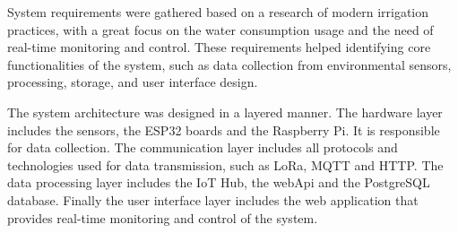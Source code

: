 System requirements were gathered based on a research of modern irrigation practices, with a great focus on the water consumption
usage and the need of real-time monitoring and control. These requirements helped identifying core functionalities of the system,
such as data collection from environmental sensors, processing, storage, and user interface design. 

The system architecture was designed in a layered manner. The hardware layer includes the sensors, the ESP32 boards
and the Raspberry Pi. It is responsible for data collection. The communication layer includes all protocols and technologies
used for data transmission, such as LoRa, MQTT and HTTP. The data processing layer includes the IoT Hub, the webApi and the PostgreSQL database.
Finally the user interface layer includes the web application that provides real-time monitoring and control of the system. 